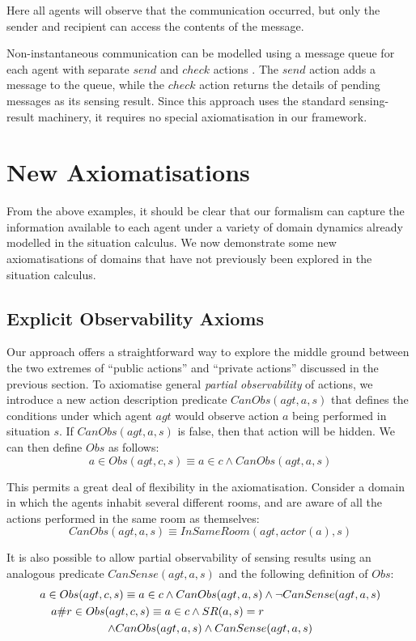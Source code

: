Here all agents will observe that the communication occurred, but
only the sender and recipient can access the contents of the message.

Non-instantaneous communication can be modelled using a message queue
for each agent with separate $send$ and $check$ actions \citep{Lesperance99sitcalc_approach}.
The $send$ action adds a message to the queue, while the $check$
action returns the details of pending messages as its sensing result.
Since this approach uses the standard sensing-result machinery, it
requires no special axiomatisation in our framework.


\section{New Axiomatisations\label{sec:Observations:Axiomatising-extended}}

From the above examples, it should be clear that our formalism can
capture the information available to each agent under a variety of
domain dynamics already modelled in the situation calculus. We now
demonstrate some new axiomatisations of domains that have not previously
been explored in the situation calculus.


\subsection{Explicit Observability Axioms\label{sec:Observations:CanObs}}

Our approach offers a straightforward way to explore the middle ground
between the two extremes of {}``public actions'' and {}``private
actions'' discussed in the previous section. To axiomatise general
\emph{partial observability} of actions, we introduce a new action
description predicate $CanObs(agt,a,s)$ that defines the conditions
under which agent $agt$ would observe action $a$ being performed
in situation $s$. If $CanObs(agt,a,s)$ is false, then that action
will be hidden. We can then define $Obs$ as follows:\[
a\in Obs(agt,c,s)\equiv a\in c\wedge CanObs(agt,a,s)\]


This permits a great deal of flexibility in the axiomatisation. Consider
a domain in which the agents inhabit several different rooms, and
are aware of all the actions performed in the same room as themselves:\[
CanObs(agt,a,s)\equiv InSameRoom(agt,actor(a),s)\]


It is also possible to allow partial observability of sensing results
using an analo\-gous predicate $CanSense(agt,a,s)$ and the following
definition of $Obs$:\begin{multline*}
a\in Obs(agt,c,s)\equiv a\in c\wedge CanObs(agt,a,s)\wedge\neg CanSense(agt,a,s)\\
\shoveleft{a\#r\in Obs(agt,c,s)\equiv a\in c\wedge SR(a,s)=r}\\
\wedge CanObs(agt,a,s)\wedge CanSense(agt,a,s)\end{multline*}


